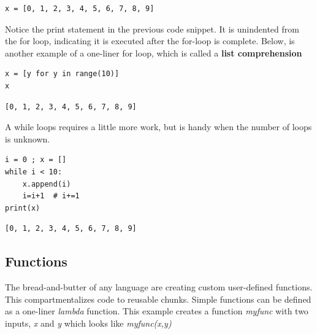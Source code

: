 \documentclass[%
oneside,                 %
final,                   %
10pt]{article}
\begin{document}

\begin{Verbatim}[numbers=none,fontsize=\fontsize{9pt}{9pt},baselinestretch=0.95,xleftmargin=2mm]
x = [0, 1, 2, 3, 4, 5, 6, 7, 8, 9]
\end{Verbatim}

Notice the print statement in the previous code snippet. It is unindented from the for loop, indicating it is executed after the for-loop is complete. Below, is another example of a one-liner for loop, which is called a \textbf{list comprehension}
\begin{Verbatim}[numbers=none,fontsize=\fontsize{9pt}{9pt},baselinestretch=0.95,xleftmargin=2mm]
x = [y for y in range(10)]
x
\end{Verbatim}

\begin{Verbatim}[numbers=none,fontsize=\fontsize{9pt}{9pt},baselinestretch=0.95,xleftmargin=2mm]
[0, 1, 2, 3, 4, 5, 6, 7, 8, 9]
\end{Verbatim}

A while loops requires a little more work, but is handy when the number of loops is unknown.

\begin{Verbatim}[numbers=none,fontsize=\fontsize{9pt}{9pt},baselinestretch=0.95,xleftmargin=2mm]
i = 0 ; x = []
while i < 10:
    x.append(i)
    i=i+1  # i+=1
print(x)
\end{Verbatim}

\begin{Verbatim}[numbers=none,fontsize=\fontsize{9pt}{9pt},baselinestretch=0.95,xleftmargin=2mm]
[0, 1, 2, 3, 4, 5, 6, 7, 8, 9]
\end{Verbatim}

\subsection{Functions}

The bread-and-butter of any language are creating custom user-defined functions. This compartmentalizes code to reusable chunks. Simple functions can be defined as a one-liner \emph{lambda} function. This example creates a function \emph{myfunc} with two inputs, \emph{x} and \emph{y} which looks like  \emph{myfunc(x,y)}
\end{document}
